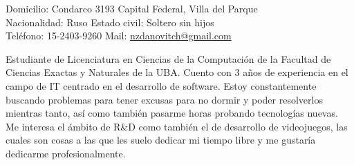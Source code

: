 \documentclass[10pt,a4paper]{article}
\begin{document}
\sloppy  %



\nobreakvspace{0.3em}  %

\noindent
Domicilio: Condarco 3193 \sbull Capital Federal, Villa del Parque \\
Nacionalidad: Ruso \sbull
Estado civil: Soltero sin hijos \\
Teléfono: 15-2403-9260 \sbull
Mail: \href{mailto:nzdanovitch.at.gmail.dot.com}{nzdanovitch\mbox{}@\mbox{}gmail.com}


\spacedhrule{1.2em}{-0.4em}  %



\vspace{-1.3em}  %
\begin{multicols}{2}  %
\noindent 
Estudiante de Licenciatura en Ciencias de la Computación de la Facultad de Ciencias Exactas y Naturales de la UBA.
Cuento con 3 años de experiencia en el campo de IT centrado en el desarrollo de software.
Estoy constantemente buscando problemas para tener excusas para no dormir y poder resolverlos mientras tanto, 
así como también pasarme horas probando tecnologías nuevas.
Me interesa el ámbito de R\&D como también el de desarrollo de videojuegos, las cuales son cosas a las que les 
suelo dedicar mi tiempo libre y me gustaría dedicarme profesionalmente.
\end{multicols}
\end{document}
